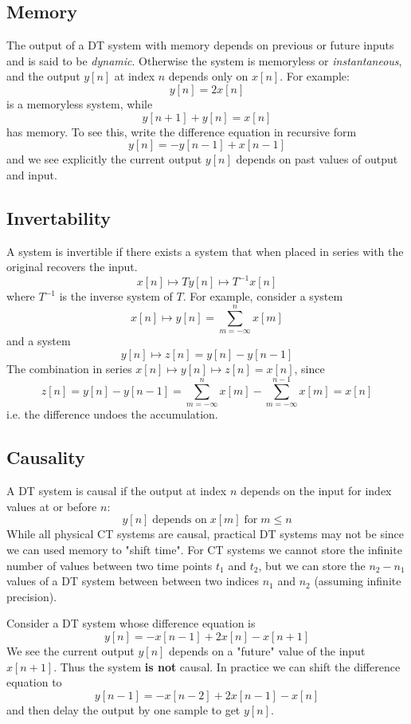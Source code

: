 \subsection{Memory}
The output of a DT system with memory depends on previous or future inputs and is said to be {\it dynamic}. Otherwise the system is memoryless or {\it instantaneous}, and the output $y[n]$ at index $n$ depends only on $x[n]$.
For example:
\[
y[n] = 2x[n]
\]
is a memoryless system, while
\[
y[n+1] + y[n] = x[n]
\]
has memory. To  see this, write the difference equation in recursive form
\[
y[n] = -y[n-1] + x[n-1]
\]
and we see explicitly the current output $y[n]$ depends on past values of output and input.

\subsection{Invertability}

A system is invertible if there exists a system that when placed in series with the original recovers the input.
\[
x[n] \mapsto{T} y[n] \mapsto{T^{-1}} x[n]
\]
where $T^{-1}$ is the inverse system of $T$. For example, consider a system
\[
x[n] \mapsto y[n] = \sum\limits_{m=-\infty}^{n} x[m]
\]
and a system
\[
y[n] \mapsto z[n] = y[n] - y[n-1]
\]
The combination in series $x[n] \mapsto y[n] \mapsto z[n] = x[n]$, since
\[
z[n] = y[n] - y[n-1] = \sum\limits_{m=-\infty}^{n} x[m] - \sum\limits_{m=-\infty}^{n-1} x[m] = x[n]
\]
i.e. the difference undoes the accumulation.

\subsection{Causality}
A DT system is causal if the output at index $n$ depends on the input for index values at or before $n$:
\[
y[n] \;\text{depends on}\; x[m] \;\text{for} \; m \leq n
\]
While all physical CT systems are causal, practical DT systems may not be since we can used memory to "shift time". For CT systems we cannot store the infinite number of values between two time points $t_1$ and $t_2$, but we can store the $n_2-n_1$ values of a DT system between between two indices $n_1$ and $n_2$ (assuming infinite precision).

\begin{example}
Consider a DT system whose difference equation is
\[
y[n] = -x[n-1] + 2x[n] - x[n+1]
\]
We see the current output $y[n]$ depends on a "future" value of the input $x[n+1]$. Thus the system \textbf{is not} causal. In practice we can shift the difference equation to
\[
y[n-1] = -x[n-2] + 2x[n-1] - x[n]
\]
and then delay the output by one sample to get $y[n]$.
\end{example}

